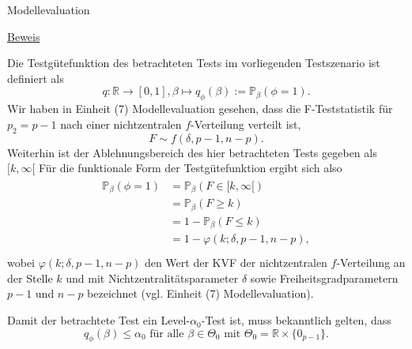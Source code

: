 \documentclass[
  8pt,
  ignorenonframetext,
]{beamer}
\begin{document}
\begin{frame}{Modellevaluation}
\protect\hypertarget{modellevaluation-16}{}
\footnotesize

\underline{Beweis}

Die Testgütefunktion des betrachteten Tests im vorliegenden Testszenario
ist definiert als \begin{equation}
q : \mathbb{R} \to [0,1], \beta \mapsto q_\phi(\beta) := \mathbb{P}_\beta(\phi = 1).
\end{equation} Wir haben in Einheit (7) Modellevaluation gesehen, dass
die F-Teststatistik für \(p_2 = p - 1\) nach einer nichtzentralen
\(f\)-Verteilung verteilt ist, \begin{equation}
F \sim f(\delta,p-1, n-p).
\end{equation} Weiterhin ist der Ablehnungsbereich des hier betrachteten
Tests gegeben als \([k,\infty[\) Für die funktionale Form der
Testgütefunktion ergibt sich also \begin{align}
\begin{split}
\mathbb{P}_\beta(\phi = 1)
& = \mathbb{P}_\beta(F \in [k,\infty[) \\
& = \mathbb{P}_\beta(F \ge k) \\
& = 1 - \mathbb{P}_\beta(F \le k) \\
& = 1 - \varphi(k;\delta,p-1,n-p),  \\
\end{split}
\end{align} wobei \(\varphi(k;\delta,p-1,n-p)\) den Wert der KVF der
nichtzentralen \(f\)-Verteilung an der Stelle \(k\) und mit
Nichtzentralitätsparameter \(\delta\) sowie Freiheitsgradparametern
\(p-1\) und \(n-p\) bezeichnet (vgl. Einheit (7) Modellevaluation).

Damit der betrachtete Test ein Level-\(\alpha_0\)-Test ist, muss
bekanntlich gelten, dass \begin{equation}
q_\phi(\beta) \le \alpha_0 \mbox{ für alle } \beta \in \Theta_0 \mbox{ mit } \Theta_0 = \mathbb{R} \times \{0_{p-1}\}.
\end{equation}
\end{frame}
\end{document}
